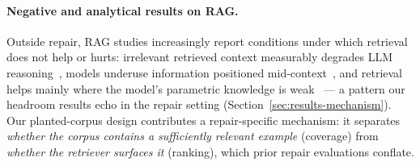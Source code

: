 \paragraph{Negative and analytical results on RAG.} Outside repair, RAG
studies increasingly report conditions under which retrieval does not help or
hurts: irrelevant retrieved context measurably degrades LLM
reasoning~\cite{distracted}, models underuse information positioned
mid-context~\cite{lostinmiddle}, and retrieval helps mainly where the
model's parametric knowledge is weak~\cite{whennottotrust} --- a pattern our
headroom results echo in the repair setting
(Section~\ref{sec:results-mechanism}). Our planted-corpus design contributes
a repair-specific mechanism: it separates \emph{whether the corpus contains a
sufficiently relevant example} (coverage) from \emph{whether the retriever
surfaces it} (ranking), which prior repair evaluations conflate.
